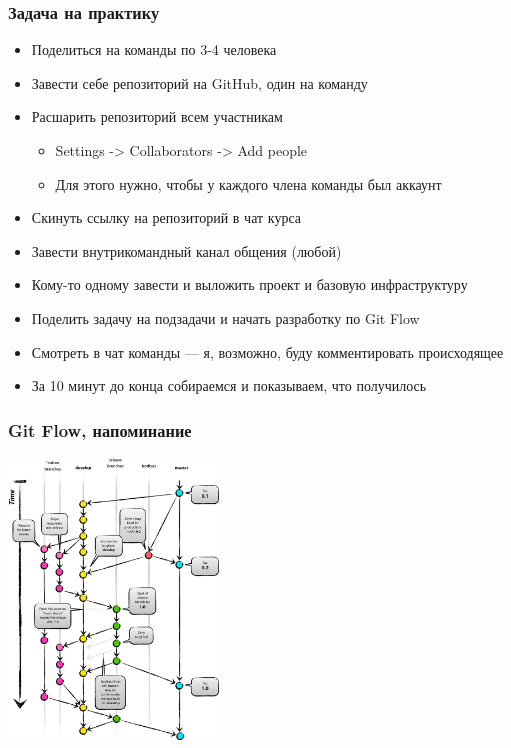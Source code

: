 \documentclass{../../slides-style}
\begin{document}
    \begin{frame}[plain]
        \titlepage
    \end{frame}

    \begin{frame}
        \frametitle{Задача на практику}
        \begin{itemize}
            \item Поделиться на команды по 3-4 человека
            \item Завести себе репозиторий на GitHub, один на команду
            \item Расшарить репозиторий всем участникам
            \begin{itemize}
                \item Settings -> Collaborators -> Add people
                \item Для этого нужно, чтобы у каждого члена команды был аккаунт
            \end{itemize}
            \item Скинуть ссылку на репозиторий в чат курса
            \item Завести внутрикомандный канал общения (любой)
            \item Кому-то одному завести и выложить проект и базовую инфраструктуру
            \item Поделить задачу на подзадачи и начать разработку по Git Flow
            \item Смотреть в чат команды --- я, возможно, буду комментировать происходящее
            \item За 10 минут до конца собираемся и показываем, что получилось
        \end{itemize}
    \end{frame}

    \begin{frame}
        \frametitle{Git Flow, напоминание}
        \begin{center}
            \includegraphics[width=0.42\textwidth]{gitFlow.png}
        \end{center}
    \end{frame}
\end{document}
